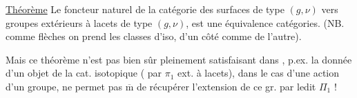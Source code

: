 \uline{Théorème}  Le foncteur naturel de la catégorie  des surfaces de type $(g,\nu)$ vers   groupes extérieurs à lacets de type $(g,\nu)$, est une équivalence  catégories. (NB. comme flèches on prend les classes d'iso, d'un côté comme de l'autre).

Mais ce théorème n'est pas bien sûr pleinement satisfaisant dans , p.ex. la donnée d'un objet de la cat. isotopique ( par  $\pi_1$ ext. à lacets), dans le cas d'une action d'un groupe, ne permet pas $\overline{\mathrm m}$ de récupérer
l'extension de ce gr. par ledit $\Pi_1$ !

